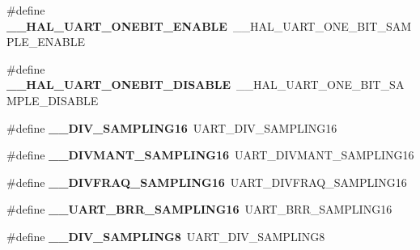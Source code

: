 \begin{DoxyCompactItemize}
\#define {\bfseries \+\_\+\+\_\+\+H\+A\+L\+\_\+\+U\+A\+R\+T\+\_\+\+O\+N\+E\+B\+I\+T\+\_\+\+E\+N\+A\+B\+LE}~\+\_\+\+\_\+\+H\+A\+L\+\_\+\+U\+A\+R\+T\+\_\+\+O\+N\+E\+\_\+\+B\+I\+T\+\_\+\+S\+A\+M\+P\+L\+E\+\_\+\+E\+N\+A\+B\+LE
\item 
\mbox{\label{group___h_a_l___u_a_r_t___aliased___defines_ga93fcc521745111012558544b198be1ce}} 
\#define {\bfseries \+\_\+\+\_\+\+H\+A\+L\+\_\+\+U\+A\+R\+T\+\_\+\+O\+N\+E\+B\+I\+T\+\_\+\+D\+I\+S\+A\+B\+LE}~\+\_\+\+\_\+\+H\+A\+L\+\_\+\+U\+A\+R\+T\+\_\+\+O\+N\+E\+\_\+\+B\+I\+T\+\_\+\+S\+A\+M\+P\+L\+E\+\_\+\+D\+I\+S\+A\+B\+LE
\item 
\mbox{\label{group___h_a_l___u_a_r_t___aliased___defines_ga95b08a06aee2ed42542ac95224cf13a8}} 
\#define {\bfseries \+\_\+\+\_\+\+D\+I\+V\+\_\+\+S\+A\+M\+P\+L\+I\+N\+G16}~U\+A\+R\+T\+\_\+\+D\+I\+V\+\_\+\+S\+A\+M\+P\+L\+I\+N\+G16
\item 
\mbox{\label{group___h_a_l___u_a_r_t___aliased___defines_gaae0a8a1c78ef85c5d4e980f123dce2cb}} 
\#define {\bfseries \+\_\+\+\_\+\+D\+I\+V\+M\+A\+N\+T\+\_\+\+S\+A\+M\+P\+L\+I\+N\+G16}~U\+A\+R\+T\+\_\+\+D\+I\+V\+M\+A\+N\+T\+\_\+\+S\+A\+M\+P\+L\+I\+N\+G16
\item 
\mbox{\label{group___h_a_l___u_a_r_t___aliased___defines_ga165ca293ce5aa1dc825ce6e69f104f99}} 
\#define {\bfseries \+\_\+\+\_\+\+D\+I\+V\+F\+R\+A\+Q\+\_\+\+S\+A\+M\+P\+L\+I\+N\+G16}~U\+A\+R\+T\+\_\+\+D\+I\+V\+F\+R\+A\+Q\+\_\+\+S\+A\+M\+P\+L\+I\+N\+G16
\item 
\mbox{\label{group___h_a_l___u_a_r_t___aliased___defines_ga4ef81a279eab794f777deede4ef777cd}} 
\#define {\bfseries \+\_\+\+\_\+\+U\+A\+R\+T\+\_\+\+B\+R\+R\+\_\+\+S\+A\+M\+P\+L\+I\+N\+G16}~U\+A\+R\+T\+\_\+\+B\+R\+R\+\_\+\+S\+A\+M\+P\+L\+I\+N\+G16
\item 
\mbox{\label{group___h_a_l___u_a_r_t___aliased___defines_ga5cba2faadc25e5ece57cd3322adf4151}} 
\#define {\bfseries \+\_\+\+\_\+\+D\+I\+V\+\_\+\+S\+A\+M\+P\+L\+I\+N\+G8}~U\+A\+R\+T\+\_\+\+D\+I\+V\+\_\+\+S\+A\+M\+P\+L\+I\+N\+G8
\item 

\end{DoxyCompactItemize}
